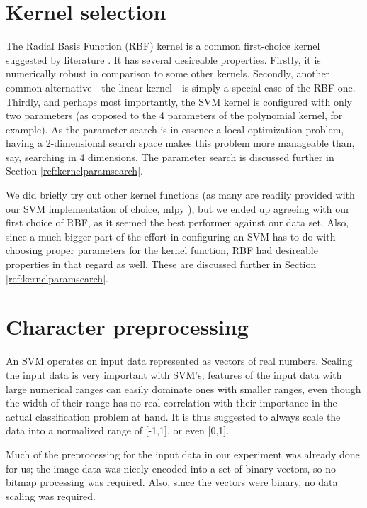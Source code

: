 \documentclass{netsec2012}
\begin{document}
\section{Kernel selection}

The Radial Basis Function (RBF) kernel is a common first-choice kernel suggested by literature
\cite{libsvm_guide,svm_chemistry}. It has several desireable properties.  Firstly, it is numerically
robust in comparison to some other kernels.  Secondly, another common alternative - the linear
kernel - is simply a special case of the RBF one.  Thirdly, and perhaps most importantly, the SVM
kernel is configured with only two parameters (as opposed to the 4 parameters of the polynomial
kernel, for example).  As the parameter search is in essence a local optimization problem, having a
2-dimensional search space makes this problem more manageable than, say, searching in 4 dimensions.
The parameter search is discussed further in Section \ref{ref:kernelparamsearch}. \cite{libsvm_guide}

We did briefly try out other kernel functions (as many are readily provided with our SVM
implementation of choice, mlpy \cite{albanese12mlpy}), but we ended up agreeing with our first
choice of RBF, as it seemed the best performer against our data set.  Also, since a much bigger part
of the effort in configuring an SVM has to do with choosing proper parameters for the kernel
function, RBF had desireable properties in that regard as well.  These are discussed further in
Section \ref{ref:kernelparamsearch}.

\section{Character preprocessing}

An SVM operates on input data represented as vectors of real numbers.  Scaling the input data is
very important with SVM's; features of the input data with large numerical ranges can easily
dominate ones with smaller ranges, even though the width of their range has no real correlation with
their importance in the actual classification problem at hand.  It is thus suggested to always scale
the data into a normalized range of [-1,1], or even [0,1]. \cite{libsvm_guide}

Much of the preprocessing for the input data in our experiment was already done for us; the image
data was nicely encoded into a set of binary vectors, so no bitmap processing was required.  Also,
since the vectors were binary, no data scaling was required.
\end{document}
